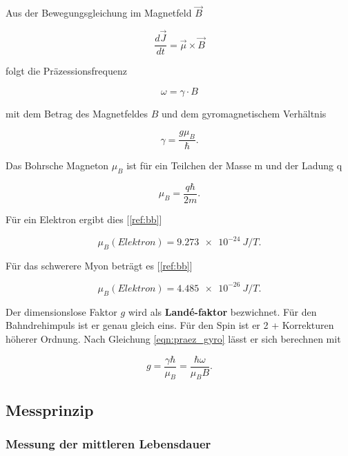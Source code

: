 \documentclass[a4paper,ngerman]{scrartcl}
\begin{document}
Aus der Bewegungsgleichung im Magnetfeld $\vec{B}$

\begin{equation}
\frac{d\vec{J}}{dt} = \vec{\mu} \times \vec{B}
\end{equation}

folgt die Präzessionsfrequenz

\begin{equation}
\omega = \gamma \cdot B
\end{equation}

mit dem Betrag des Magnetfeldes $B$ und dem gyromagnetischem Verhältnis 

\begin{equation}
\label{eqn:praez_gyro}
\gamma = \frac{g \mu_B}{\hbar}. 
\end{equation}

Das Bohrsche Magneton $\mu_B$ ist für ein Teilchen der Masse m und der Ladung q

\begin{equation}
\mu_B = \frac{q\hbar}{2 m} .
\end{equation}


Für ein Elektron ergibt dies [\ref{ref:bb}]

\begin{equation}
\mu_B (Elektron) = \SI{9.273e-24}{ J/T } .
\end{equation}

Für das schwerere Myon beträgt es [\ref{ref:bb}]

\begin{equation}
\mu_B (Elektron) = \SI{4.485e-26}{ J/T } .
\end{equation} 


Der dimensionslose Faktor $g$ wird als \textbf{Landé-faktor} bezwichnet. Für den Bahndrehimpuls ist er genau gleich eins. Für den Spin ist er 2 + Korrekturen höherer Ordnung. Nach Gleichung \ref{eqn:praez_gyro} lässt er sich berechnen mit

\begin{equation}
g = \frac{\gamma \hbar}{\mu_B} = \frac{\hbar \omega}{\mu_B B} .
\end{equation}


\subsection{Messprinzip}
\label{sec:messprinzip}

\subsubsection*{Messung der mittleren Lebensdauer}
\end{document}
